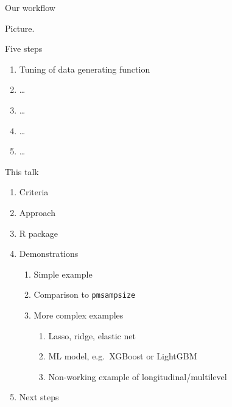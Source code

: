 \documentclass[11pt]{beamer}
\begin{document}
\begin{frame}{Our workflow}

    Picture.
    
\end{frame}

\begin{frame}{Five steps}
    \begin{enumerate}
        \item Tuning of data generating function
        \item \ldots
        \item \ldots
        \item \ldots
        \item \ldots
    \end{enumerate}
\end{frame}

\begin{frame}{This talk}
    \begin{enumerate}
        \item Criteria
        \item Approach
        \item R package
        \item Demonstrations
        \begin{enumerate}
            \item Simple example
            \item Comparison to \texttt{pmsampsize}
            \item More complex examples
            \begin{enumerate}
                \item Lasso, ridge, elastic net
                \item ML model, e.g.\ XGBoost or LightGBM
                \item Non-working example of longitudinal/multilevel
            \end{enumerate}
        \end{enumerate}
        \item Next steps
    \end{enumerate}
\end{frame}

\end{document}
